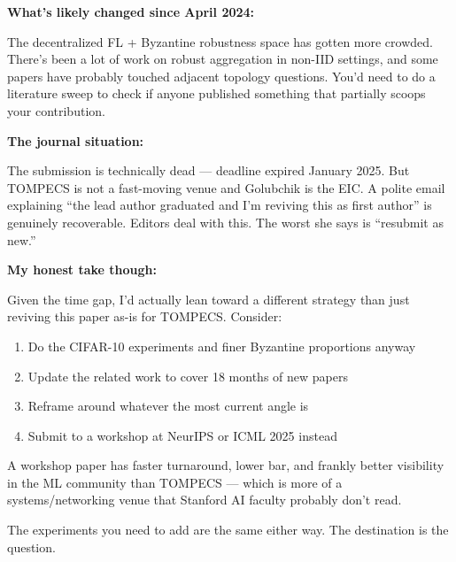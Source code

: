 \documentclass[11pt]{article}
\begin{document}
\begin{chatquote}
\textbf{What's likely changed since April 2024:}

The decentralized FL + Byzantine robustness space has gotten more crowded. There's been a lot of work on robust aggregation in non-IID settings, and some papers have probably touched adjacent topology questions. You'd need to do a literature sweep to check if anyone published something that partially scoops your contribution.

\medskip
\textbf{The journal situation:}

The submission is technically dead --- deadline expired January 2025. But TOMPECS is not a fast-moving venue and Golubchik is the EIC. A polite email explaining ``the lead author graduated and I'm reviving this as first author'' is genuinely recoverable. Editors deal with this. The worst she says is ``resubmit as new.''

\medskip
\textbf{My honest take though:}

Given the time gap, I'd actually lean toward a different strategy than just reviving this paper as-is for TOMPECS. Consider:
\begin{enumerate}[nosep]
  \item Do the CIFAR-10 experiments and finer Byzantine proportions anyway
  \item Update the related work to cover 18 months of new papers
  \item Reframe around whatever the most current angle is
  \item Submit to a workshop at NeurIPS or ICML 2025 instead
\end{enumerate}

\medskip
A workshop paper has faster turnaround, lower bar, and frankly better visibility in the ML community than TOMPECS --- which is more of a systems/networking venue that Stanford AI faculty probably don't read.

\medskip
The experiments you need to add are the same either way. The destination is the question.
\end{chatquote}
\end{document}
